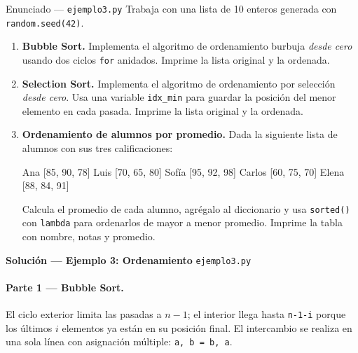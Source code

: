 \documentclass[12pt,a4paper]{article}
\begin{document}
\vspace{0.8em}
\begin{enunciadobox}{Enunciado — \texttt{ejemplo3.py}}
Trabaja con una lista de 10 enteros generada con \texttt{random.seed(42)}.

\begin{enumerate}
  \item \textbf{Bubble Sort.}
        Implementa el algoritmo de ordenamiento burbuja \emph{desde cero} usando
        dos ciclos \texttt{for} anidados. Imprime la lista original y la ordenada.

  \item \textbf{Selection Sort.}
        Implementa el algoritmo de ordenamiento por selección \emph{desde cero}.
        Usa una variable \texttt{idx\_min} para guardar la posición del menor
        elemento en cada pasada. Imprime la lista original y la ordenada.

  \item \textbf{Ordenamiento de alumnos por promedio.}
        Dada la siguiente lista de alumnos con sus tres calificaciones:
        \begin{center}
        \small
        Ana [85, 90, 78] \quad Luis [70, 65, 80] \quad Sofía [95, 92, 98]
        \quad Carlos [60, 75, 70] \quad Elena [88, 84, 91]
        \end{center}
        Calcula el promedio de cada alumno, agrégalo al diccionario y usa
        \texttt{sorted()} con \texttt{lambda} para ordenarlos de mayor a menor
        promedio.  Imprime la tabla con nombre, notas y promedio.
\end{enumerate}
\end{enunciadobox}

\newpage
\begin{solucionbanner}
  {\large\bfseries\color{solColor} Solución — Ejemplo 3: Ordenamiento}
  \hfill \texttt{ejemplo3.py}
\end{solucionbanner}

\vspace{0.8em}


\vspace{0.8em}
\paragraph{Parte 1 — Bubble Sort.}
El ciclo exterior limita las pasadas a $n-1$; el interior llega hasta
\texttt{n-1-i} porque los últimos $i$ elementos ya están en su posición final.
El intercambio se realiza en una sola línea con asignación múltiple: \texttt{a, b = b, a}.
\end{document}
